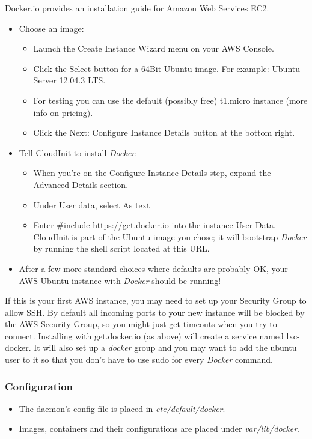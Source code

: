 \documentclass[11pt]{article}
\begin{document}
Docker.io provides an installation guide for Amazon Web Services EC2.
\begin{itemize}
\item Choose an image:
\begin{itemize}
\item Launch the Create Instance Wizard menu on your AWS Console.
\item Click the Select button for a 64Bit Ubuntu image. For example: Ubuntu Server 12.04.3 LTS.
\item For testing you can use the default (possibly free) t1.micro instance (more info on pricing).
\item Click the Next: Configure Instance Details button at the bottom right.
\end{itemize}
\item Tell CloudInit to install \emph{Docker}:
\begin{itemize}
\item When you're on the Configure Instance Details step, expand the Advanced Details section.
\item Under User data, select As text
\item Enter \#include \href{https://get.docker.io}{https://get.docker.io}  into the instance User Data. CloudInit is part of the Ubuntu image you chose; it will bootstrap \emph{Docker} by running the shell script located at this URL.
\end{itemize}
\item After a few more standard choices where defaults are probably OK, your AWS Ubuntu instance with \emph{Docker} should be running!
\end{itemize}
If this is your first AWS instance, you may need to set up your Security Group to allow SSH. By default all incoming ports to your new instance will be blocked by the AWS Security Group, so you might just get
timeouts when you try to connect. Installing with get.docker.io (as above) will create a service named lxc-
docker. It will also set up a \emph{docker} group and you may want to add the ubuntu user to it so that you don't have to use sudo for every \emph{Docker} command.
\subsubsection{Configuration}
\label{sec-2-2-5}

\begin{itemize}
\item The daemon's config file is placed in \emph{etc/default/docker}.
\item Images, containers and their configurations are placed under \emph{var/lib/docker}.
\end{itemize}
\end{document}

